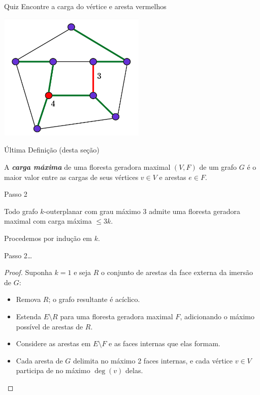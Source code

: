 \begin{frame}{Quiz}
    \centering\Large
    Encontre a carga do vértice e aresta vermelhos\bigbreak
    \begin{minipage}{\linewidth}
        \centering
        \includegraphics[width=7cm]{images/load_2.jpg}
    \end{minipage}
\end{frame}

\begin{frame}{Última Definição (desta seção)}
    \begin{defi}
        A \emph{\textbf{carga máxima}} de uma floresta geradora maximal $(V, F)$ de um grafo $G$ é o maior valor entre as cargas de seus vértices $v \in V$ e arestas $e \in F$.
    \end{defi}
\end{frame}

\begin{frame}{Passo 2}
    \begin{lema}
        Todo grafo $k$-outerplanar com grau máximo 3 admite uma floresta geradora maximal com carga máxima $\leq 3k$.
    \end{lema}
    \bigbreak\pause
    Procedemos por indução em $k$.
\end{frame}

\begin{frame}{Passo 2\dots}
    \begin{proof}
    Suponha $k = 1$ e seja $R$ o conjunto de arestas da face externa da imersão de $G$:
    \begin{itemize}[-]
        \item Remova $R$; o grafo resultante é acíclico.
        \item Estenda $E \setminus R$ para uma floresta geradora maximal $F$, adicionando o máximo possível de arestas de $R$.
        \item Considere as arestas em $E \setminus F$ e as faces internas que elas formam.
        \item Cada aresta de $G$ delimita no máximo 2 faces internas, e cada vértice $v \in V$ participa de no máximo $\deg(v)$ delas.
    \end{itemize}
    \end{proof}
\end{frame}

